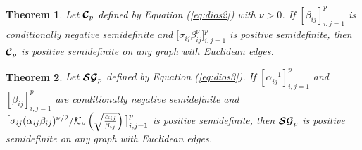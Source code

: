 \documentclass[12pt]{article}
\theoremstyle{plain}
\newtheorem{theorem}{Theorem}[section]
\theoremstyle{remark}
\begin{document}

{\begin{theorem} 
        \label{theo:dios2}
        Let $\boldsymbol{{\cal C}}_p$ defined by Equation (\ref{eq:dios2}) with $\nu > 0$. 
        If $[\beta_{ij}]_{i,j=1}^p$ is conditionally negative semidefinite and $\big[\sigma_{ij} \beta_{ij}^{\nu} \big]_{i,j=1}^p$ is positive semidefinite, then $\boldsymbol{{\cal C}}_p$ is positive semidefinite on any graph with Euclidean edges.
\end{theorem}}

{\begin{theorem} 
        \label{theo:dios3}
        Let $\boldsymbol{{\cal SG}}_p$ defined by Equation (\ref{eq:dios3}). 
        If $[\alpha_{ij}^{-1}]_{i,j=1}^p$ and $[\beta_{ij}]_{i,j=1}^p$ are conditionally negative semidefinite and $\big[\sigma_{ij} (\alpha_{ij} \beta_{ij})^{\nu/2}/{\cal K}_\nu\left(\sqrt{\frac{\alpha_{ij}}{ \beta_{ij}}}\right) \big]_{i,j=1}^p$ is positive semidefinite, then $\boldsymbol{{\cal SG}}_p$ is positive semidefinite on any graph with Euclidean edges.
\end{theorem}}
\end{document}
